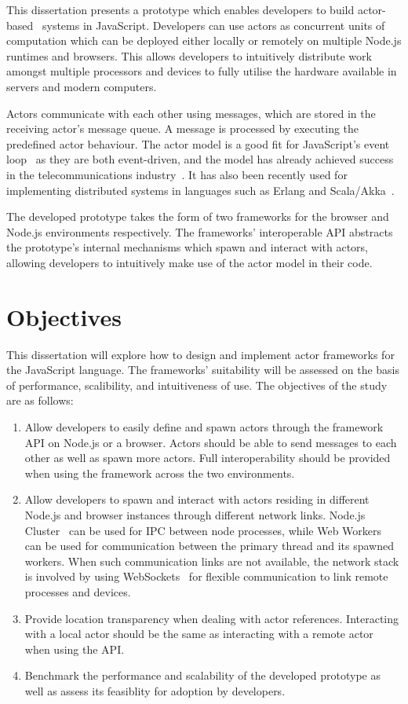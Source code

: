 \documentclass[lettersize,journal]{IEEEtran}
\begin{document}
This dissertation presents a prototype which enables developers to build actor-based~\cite{hewitt1973session, 43years} systems in JavaScript. Developers can use actors as concurrent units of computation which can be deployed either locally or remotely on multiple Node.js runtimes and browsers. This allows developers to intuitively distribute work amongst multiple processors and devices to fully utilise the hardware available in servers and modern computers.

Actors communicate with each other using messages, which are stored in the receiving actor's message queue. A message is processed by executing the predefined actor behaviour. The actor model is a good fit for JavaScript's event loop~\cite{eventloopbrowser, eventloopnode} as they are both event-driven, and the model has already achieved success in the telecommunications industry~\cite{erlang}. It has also been recently used for implementing distributed systems in languages such as Erlang and Scala/Akka~\cite{haller2012integration}.

The developed prototype takes the form of two frameworks for the browser and Node.js environments respectively. The frameworks' interoperable API abstracts the prototype's internal mechanisms which spawn and interact with actors, allowing developers to intuitively make use of the actor model in their code.
\section{Objectives}
This dissertation will explore how to design and implement actor frameworks for the JavaScript language. The frameworks' suitability will be assessed on the basis of performance, scalibility, and intuitiveness of use. The objectives of the study are as follows:
\begin{enumerate}
    \item Allow developers to easily define and spawn actors through the framework API on Node.js or a browser. Actors should be able to send messages to each other as well as spawn more actors. Full interoperability should be provided when using the framework across the two environments.
    \item Allow developers to spawn and interact with actors residing in different Node.js and browser instances through different network links. Node.js Cluster~\cite{cluster} can be used for IPC between node processes, while Web Workers~\cite{webworkers} can be used for communication between the primary thread and its spawned workers. When such communication links are not available, the network stack is involved by using WebSockets~\cite{websocket} for flexible communication to link remote processes and devices.
    \item Provide location transparency when dealing with actor references. Interacting with a local actor should be the same as interacting with a remote actor when using the API.
    \item Benchmark the performance and scalability of the developed prototype as well as assess its feasiblity for adoption by developers.
\end{enumerate}
\end{document}
